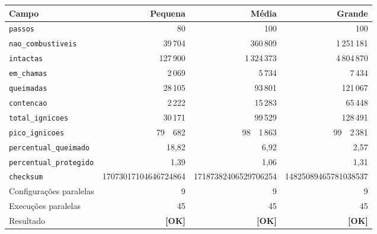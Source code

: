 \begin{tabular}{@{}lrrr@{}}
\toprule
Campo & Pequena & Média & Grande \\
\midrule
\texttt{passos} & 80 & 100 & 100 \\
\texttt{nao\_combustiveis} & 39\,704 & 360\,809 & 1\,251\,181 \\
\texttt{intactas} & 127\,900 & 1\,324\,373 & 4\,804\,870 \\
\texttt{em\_chamas} & 2\,069 & 5\,734 & 7\,434 \\
\texttt{queimadas} & 28\,105 & 93\,801 & 121\,067 \\
\texttt{contencao} & 2\,222 & 15\,283 & 65\,448 \\
\texttt{total\_ignicoes} & 30\,171 & 99\,529 & 128\,491 \\
\texttt{pico\_ignicoes} & 79\ \ 682 & 98\ \ 1\,863 & 99\ \ 2\,381 \\
\texttt{percentual\_queimado} & 18{,}82 & 6{,}92 & 2{,}57 \\
\texttt{percentual\_protegido} & 1{,}39 & 1{,}06 & 1{,}31 \\
\texttt{checksum} & 17073017104646724864 & 17187382406529706254 & 14825089465781038537 \\
\midrule
Configurações paralelas & 9 & 9 & 9 \\
Execuções paralelas & 45 & 45 & 45 \\
Resultado & \textbf{[OK]} & \textbf{[OK]} & \textbf{[OK]} \\
\bottomrule
\end{tabular}

